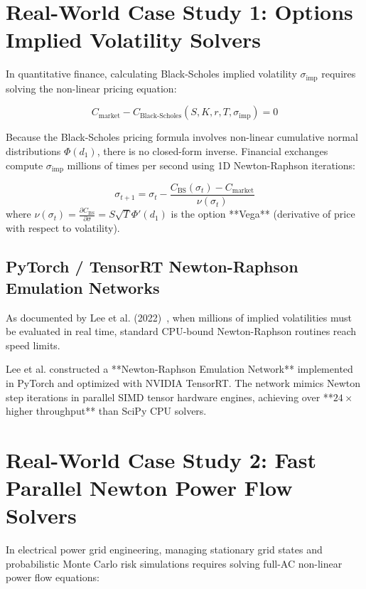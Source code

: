 \section{Real-World Case Study 1: Options Implied Volatility Solvers}
In quantitative finance, calculating Black-Scholes implied volatility $\sigma_{\text{imp}}$ requires solving the non-linear pricing equation:

\begin{equation}
C_{\text{market}} - C_{\text{Black-Scholes}}(S, K, r, T, \sigma_{\text{imp}}) = 0
\end{equation}

Because the Black-Scholes pricing formula involves non-linear cumulative normal distributions $\Phi(d_1)$, there is no closed-form inverse. Financial exchanges compute $\sigma_{\text{imp}}$ millions of times per second using 1D Newton-Raphson iterations:

\begin{equation}
\sigma_{t+1} = \sigma_t - \frac{C_{\text{BS}}(\sigma_t) - C_{\text{market}}}{\nu(\sigma_t)}
\end{equation}
where $\nu(\sigma_t) = \frac{\partial C_{\text{BS}}}{\partial \sigma} = S \sqrt{T} \Phi'(d_1)$ is the option **Vega** (derivative of price with respect to volatility).

\subsection{PyTorch / TensorRT Newton-Raphson Emulation Networks}
As documented by Lee et al. (2022)~\cite{lee2022newton}, when millions of implied volatilities must be evaluated in real time, standard CPU-bound Newton-Raphson routines reach speed limits. 

Lee et al. constructed a **Newton-Raphson Emulation Network** implemented in PyTorch and optimized with NVIDIA TensorRT. The network mimics Newton step iterations in parallel SIMD tensor hardware engines, achieving over **$24\times$ higher throughput** than SciPy CPU solvers.


\section{Real-World Case Study 2: Fast Parallel Newton Power Flow Solvers}
In electrical power grid engineering, managing stationary grid states and probabilistic Monte Carlo risk simulations requires solving full-AC non-linear power flow equations:

